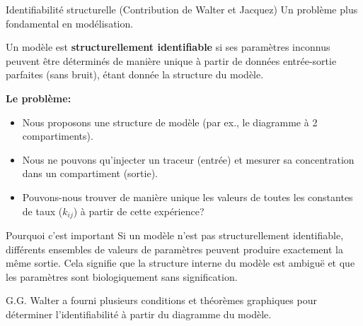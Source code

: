 \documentclass[aspectratio=169]{beamer}\usepackage[]{graphicx}\usepackage[]{xcolor}
\begin{document}
\begin{frame}{Identifiabilité structurelle (Contribution de Walter et Jacquez)}
    Un problème plus fondamental en modélisation.
    \begin{definition}
        Un modèle est \textbf{structurellement identifiable} si ses paramètres inconnus peuvent être déterminés de manière unique à partir de données entrée-sortie parfaites (sans bruit), étant donnée la structure du modèle.
    \end{definition}

    \textbf{Le problème:}
    \begin{itemize}
        \item Nous proposons une structure de modèle (par ex., le diagramme à 2 compartiments).
        \item Nous ne pouvons qu'injecter un traceur (entrée) et mesurer sa concentration dans un compartiment (sortie).
        \item Pouvons-nous trouver de manière unique les valeurs de toutes les constantes de taux ($k_{ij}$) à partir de cette expérience?
    \end{itemize}
    \vfill
    \begin{alertblock}{Pourquoi c'est important}
        Si un modèle n'est pas structurellement identifiable, différents ensembles de valeurs de paramètres peuvent produire exactement la même sortie. Cela signifie que la structure interne du modèle est ambiguë et que les paramètres sont biologiquement sans signification.
    \end{alertblock}
    \vfill
    \small{G.G. Walter a fourni plusieurs conditions et théorèmes graphiques pour déterminer l'identifiabilité à partir du diagramme du modèle.}
\end{frame}
\end{document}

